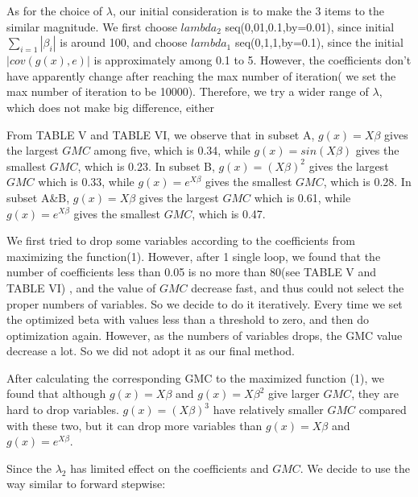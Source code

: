 \documentclass[conference,letterpaper]{IEEEtran}
\begin{document}
{As for the choice of $\lambda$, our initial consideration is to make the 3 items to the similar magnitude. We first choose $lambda_2$ seq(0,01,0.1,by=0.01), since initial $\sum_{i=1}{|\beta_i|}$ is around 100, and choose $lambda_1$ seq(0,1,1,by=0.1), since the initial $|cov(g(x),e)|$ is approximately among 0.1 to 5. However, the coefficients don't have apparently change after reaching the max number of iteration( we set the max number of iteration to be 10000). Therefore, we try a wider range of $\lambda$, which does not make big difference, either 

From TABLE V and TABLE VI, we observe that in subset A, $g(x)=X\beta$ gives the largest $GMC$ among five, which is 0.34, while $g(x)=sin(X\beta)$ gives the smallest $GMC$, which is 0.23. In subset B, $g(x)=(X\beta)^2$ gives the largest $GMC$ which is 0.33, while $g(x)=e^{X\beta}$ gives the smallest $GMC$, which is 0.28. In subset A\&B, $g(x)=X\beta$ gives the largest $GMC$ which is 0.61, while $g(x)=e^{X\beta}$ gives the smallest $GMC$, which is 0.47.       

We first tried to drop some variables according to the coefficients from maximizing the function(1). However, after 1 single loop, we found that the number of coefficients less than 0.05 is no more than 80(see TABLE V and TABLE VI) , and the value of $GMC$ decrease fast, and thus could not select the proper numbers of variables. So we decide to do it iteratively. Every time we set the optimized beta with values less than a threshold to zero, and then do optimization again. However, as the numbers of variables drops, the GMC value decrease a lot. So we did not adopt it as our final method.

After calculating the corresponding GMC to the maximized function (1), we found that although $g(x)=X\beta$ and $g(x)={X\beta}^2$ give larger $GMC$, they are hard to drop variables. $g(x)=(X\beta)^3$ have relatively smaller $GMC$ compared with these two, but it can drop more variables than $g(x)=X\beta$ and $g(x)=e^{X\beta}$.  

Since the $\lambda_2$ has limited effect on the coefficients and $GMC$. We decide to use the way similar to forward stepwise:

}
\end{document}
